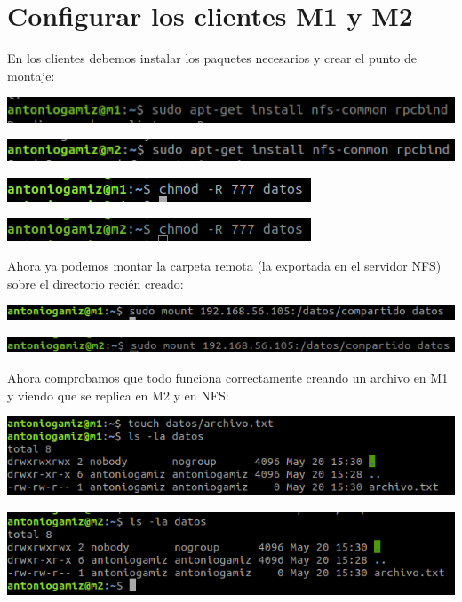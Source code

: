 \documentclass[12pt]{article}
\begin{document}
\section{Configurar los clientes M1 y M2}

En los clientes debemos instalar los paquetes 
necesarios y crear el punto de montaje:

\medskip

\centerline{\includegraphics[scale=0.6]{11.png}}

\centerline{\includegraphics[scale=0.6]{12.png}}

\centerline{\includegraphics[scale=0.6]{13.png}}

\centerline{\includegraphics[scale=0.6]{14.png}}

Ahora ya podemos montar la carpeta remota (la exportada en el servidor NFS) sobre el directorio recién creado:\\

\centerline{\includegraphics[scale=0.6]{15.png}}

\centerline{\includegraphics[scale=0.6]{16.png}}

Ahora comprobamos que todo funciona correctamente creando un archivo en M1 y viendo que se replica en M2 y en NFS:\\

\centerline{\includegraphics[scale=0.6]{17.png}}

\centerline{\includegraphics[scale=0.6]{18.png}}
\end{document}
